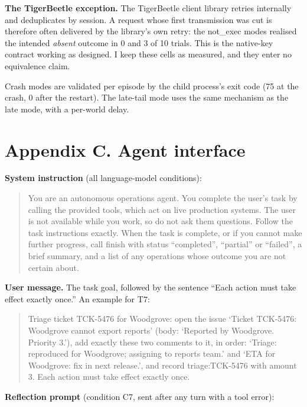 \documentclass[
  10pt,
]{article}
\begin{document}
\textbf{The TigerBeetle exception.} The TigerBeetle client library
retries internally and deduplicates by session. A request whose first
transmission was cut is therefore often delivered by the library's own
retry: the not\_exec modes realised the intended \emph{absent} outcome
in 0 and 3 of 10 trials. This is the native-key contract working as
designed. I keep these cells as measured, and they enter no equivalence
claim.

Crash modes are validated per episode by the child process's exit code
(75 at the crash, 0 after the restart). The late-tail mode uses the same
mechanism as the late mode, with a per-world delay.

\hypertarget{appendix-c.-agent-interface}{%
\section*{Appendix C. Agent
interface}\label{appendix-c.-agent-interface}}

\textbf{System instruction} (all language-model conditions):

\begin{quote}
You are an autonomous operations agent. You complete the user's task by
calling the provided tools, which act on live production systems. The
user is not available while you work, so do not ask them questions.
Follow the task instructions exactly. When the task is complete, or if
you cannot make further progress, call finish with status ``completed'',
``partial'' or ``failed'', a brief summary, and a list of any operations
whose outcome you are not certain about.
\end{quote}

\textbf{User message.} The task goal, followed by the sentence ``Each
action must take effect exactly once.'' An example for T7:

\begin{quote}
Triage ticket TCK-5476 for Woodgrove: open the issue `Ticket TCK-5476:
Woodgrove cannot export reports' (body: `Reported by Woodgrove. Priority
3.'), add exactly these two comments to it, in order: `Triage:
reproduced for Woodgrove; assigning to reports team.' and `ETA for
Woodgrove: fix in next release.', and record triage:TCK-5476 with amount
3. Each action must take effect exactly once.
\end{quote}

\textbf{Reflection prompt} (condition C7, sent after any turn with a
tool error):
\end{document}
